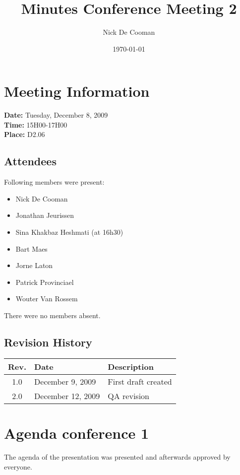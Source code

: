 \documentclass[a4paper, 12pt]{article}
\begin{document}
\title{Minutes Conference Meeting 2}
\author{Nick De Cooman}
\date{\today}

\maketitle	
	\section{Meeting Information}
		\textbf{Date:} Tuesday, December 8, 2009\\
		\textbf{Time:} 15H00-17H00\\
		\textbf{Place:} D2.06\\
		
		\subsection{Attendees}
Following members were present:
			\begin{itemize}
				\item Nick De Cooman
				\item Jonathan Jeurissen
				\item Sina Khakbaz Heshmati (at 16h30)
				\item Bart Maes
				\item Jorne Laton
				\item Patrick Provinciael
				\item Wouter Van Rossem
			\end{itemize}
There were no members absent.
			
		\subsection{Revision History}
			\begin{tabular}{c | l | l }
				\textbf{Rev.} & \textbf{Date} & \textbf{Description} \\
				\hline
				1.0 & December 9, 2009 & First draft created \\
				2.0 & December 12, 2009 & QA revision \\

			\end{tabular}		

\section{Agenda conference 1}

The agenda of the presentation was presented and afterwards approved by everyone.
\end{document}
